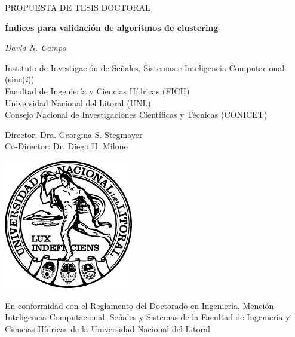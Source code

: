 \documentclass[a4paper,8pt]{article}
\newcommand{\sinc}{{\color{blue}s}inc(\textit{\color{red}i})}
\begin{document}
\begin{titlepage}
	\centering	
	{\scshape\large PROPUESTA DE TESIS DOCTORAL \par}
	\vspace{2cm}
	{\Large\bfseries \'Indices para validaci\'on de algoritmos de clustering\par}
	\vspace{1.5cm}
	{\Large\itshape David N. Campo \par}
	\vspace{2cm}
	{\normalsize Instituto de Investigación de Señales, Sistemas e Inteligencia Computacional (\sinc{}) \\ \bigskip
		Facultad de Ingeniería y Ciencias Hídricas (FICH) \\ \bigskip
		Universidad Nacional del Litoral (UNL) \\ \bigskip
		Consejo Nacional de Investigaciones Científicas y Técnicas (CONICET)\par} \bigskip
	\vfill
	{\large Director: Dra. Georgina S. Stegmayer\\
	Co-Director: Dr. Diego H. Milone\par}
	\vfill
	\includegraphics{logo_unl}\par\vspace{1cm}
	
	

	{\normalsize En conformidad con el Reglamento del Doctorado en Ingeniería, Mención Inteligencia Computacional, Señales 	y Sistemas de la Facultad de Ingeniería y Ciencias Hídricas de la Universidad Nacional del Litoral\par}	
\end{titlepage}



\setcounter{page}{1}
\newpage
\pagestyle{fancy}
\end{document}
